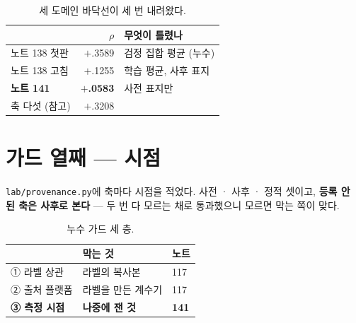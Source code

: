 \documentclass[10pt]{article}
\begin{document}

\begin{table}[t]
\centering\tsize
\caption{세 도메인 바닥선이 세 번 내려왔다.}
\begin{tabular}{lrl}
\toprule
& $\rho$ & 무엇이 틀렸나 \\
\midrule
노트 138 첫판 & $+$.3589 & 검정 집합 평균 (누수) \\
노트 138 고침 & $+$.1255 & 학습 평균, 사후 표지 \\
\textbf{노트 141} & \textbf{$+$.0583} & 사전 표지만 \\
\midrule
축 다섯 (참고) & $+$.3208 & \\
\bottomrule
\end{tabular}
\end{table}


\section{가드 열째 --- 시점}

\texttt{lab/provenance.py}에 축마다 시점을 적었다. 사전 · 사후 · 정적
셋이고, \textbf{등록 안 된 축은 사후로 본다} --- 두 번 다 모르는 채로
통과했으니 모르면 막는 쪽이 맞다.

\begin{table}[t]
\centering\tsize
\caption{누수 가드 세 층.}
\begin{tabular}{lll}
\toprule
& 막는 것 & 노트 \\
\midrule
① 라벨 상관 & 라벨의 복사본 & 117 \\
② 출처 플랫폼 & 라벨을 만든 계수기 & 117 \\
\textbf{③ 측정 시점} & \textbf{나중에 잰 것} & \textbf{141} \\
\bottomrule
\end{tabular}
\end{table}
\end{document}
